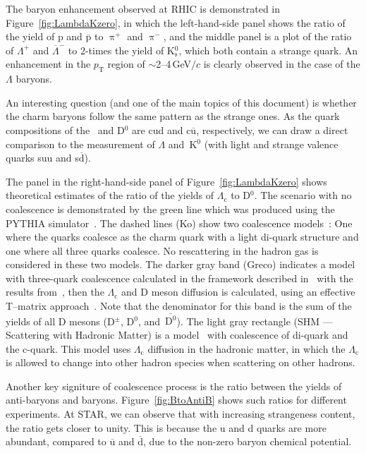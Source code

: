 The baryon enhancement observed at RHIC is demonstrated in Figure~\ref{fig:LambdaKzero}, in which the left-hand-side panel shows the ratio of the yield of p and $\overline{\mathrm{p}}$ to $\uppi^+$ and $\uppi^-$, and the middle panel is a plot of the ratio of $\Lambda^+$ and $\overline{\Lambda}^-$ to 2-times the yield of K$^0_\mathrm{s}$, which both contain a strange quark. An enhancement in the $p_\mathrm{T}$ region of $\sim$2--4$\,$GeV$/c$ is clearly observed in the case of the $\Lambda$ baryons. 

An interesting question (and one of the main topics of this document) is whether the charm baryons follow the same pattern as the strange ones. As the quark compositions of the \Lambdac\ and D$^0$ are cud and c$\overline{\mathrm{u}}$, respectively, we can draw a direct comparison to the measurement of $\Lambda$ and~K$^0$ (with light and strange valence quarks suu and s$\overline{\mathrm{d}}$).

The panel in the right-hand-side panel of Figure~\ref{fig:LambdaKzero} shows theoretical estimates of the ratio of the yields of $\Lambda_\mathrm{c}$ to D$^0$. The scenario with no coalescence is demonstrated by the green line which was produced using the PYTHIA simulator~\cite{PYTHIA}. The dashed lines (Ko) show two coalescence models~\cite{ShaoSong}: One where the  quarks coalesce as the charm quark with a light di-quark structure and one where all three quarks coalesce. No rescattering in the hadron gas is considered in these two models. The darker gray band (Greco) indicates a model with three-quark coalescence calculated in the framework described in~\cite{Greco_framework} with the results from~\cite{Greco_results}, then the $\Lambda_\mathrm{c}$ and D meson diffusion is calculated, using an effective T--matrix approach~\cite{Ghosh_Lc_rescattering}. Note that the denominator for this band is the sum of the yields of all D mesons (D$^\pm$, D$^0$, and~$\mathrm{\overline{D^0}}$). The light gray rectangle (SHM --- Scattering with Hadronic Matter) is a model~\cite{SHM} with coalescence of di-quark and the c-quark. This model uses $\Lambda_\mathrm{c}$ diffusion in the hadronic matter, in which the $\Lambda_\mathrm{c}$ is allowed to change into other hadron species when scattering on other hadrons.

Another key signiture of coalescence process is the ratio between the yields of anti-baryons and baryons. Figure~\ref{fig:BtoAntiB} shows such ratios for different experiments. At STAR, we can observe that with increasing strangeness content, the ratio gets closer to unity. This is because the u and d quarks are more abundant, compared to $\overline{\mathrm{u}}$ and $\overline{\mathrm{d}}$, due to the non-zero baryon chemical potential. 

